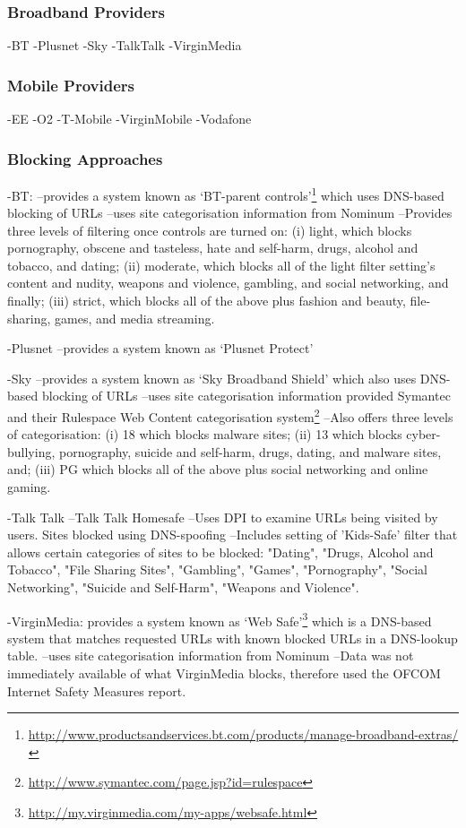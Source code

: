 \documentclass{bmcart}
\begin{document}
\subsubsection*{Broadband Providers}
-BT
-Plusnet
-Sky
-TalkTalk
-VirginMedia

\subsubsection*{Mobile Providers}
-EE
-O2
-T-Mobile
-VirginMobile
-Vodafone

\subsubsection*{Blocking Approaches}
-BT: 
--provides a system known as `BT-parent controls'\footnote{\url{http://www.productsandservices.bt.com/products/manage-broadband-extras/}} which uses DNS-based blocking of URLs
--uses site categorisation information from Nominum
--Provides three levels of filtering once controls are turned on: (i) light, which blocks pornography, obscene and tasteless, hate and self-harm, drugs, alcohol and tobacco, and dating; (ii) moderate, which blocks all of the light filter setting's content and nudity, weapons and violence, gambling, and social networking, and finally; (iii) strict, which blocks all of the above plus fashion and beauty, file-sharing, games, and media streaming.

-Plusnet
--provides a system known as `Plusnet Protect'

-Sky
--provides a system known as `Sky Broadband Shield'  which also uses DNS-based blocking of URLs
--uses site categorisation information provided Symantec and their Rulespace Web Content categorisation system\footnote{\url{http://www.symantec.com/page.jsp?id=rulespace}} 
--Also offers three levels of categorisation: (i) 18 which blocks malware sites; (ii) 13 which blocks cyber-bullying, pornography, suicide and self-harm, drugs, dating, and malware sites, and; (iii) PG which blocks all of the above plus social networking and online gaming.

-Talk Talk
--Talk Talk Homesafe
--Uses DPI to examine URLs being visited by users. Sites blocked using DNS-spoofing
--Includes setting of 'Kids-Safe' filter that allows certain categories of sites to be blocked: "Dating", "Drugs, Alcohol and Tobacco", "File Sharing Sites", "Gambling", "Games", "Pornography", "Social Networking", "Suicide and Self-Harm", "Weapons and Violence".


-VirginMedia: provides a system known as `Web Safe'\footnote{\url{http://my.virginmedia.com/my-apps/websafe.html}} which is a DNS-based system that matches requested URLs with known blocked URLs in a DNS-lookup table.
--uses site categorisation information from Nominum
--Data was not immediately available of what VirginMedia blocks, therefore used the OFCOM Internet Safety Measures report.
\end{document}
